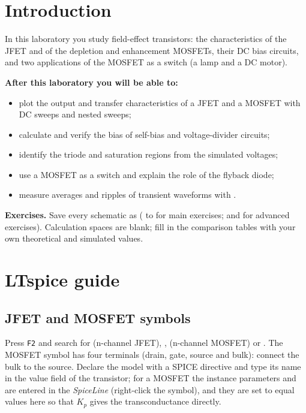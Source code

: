 
\section{Introduction}
In this laboratory you study field-effect transistors: the characteristics of the JFET and of the depletion and enhancement MOSFETs, their DC bias circuits, and two applications of the MOSFET as a switch (a lamp and a DC motor).

\textbf{After this laboratory you will be able to:}
\begin{itemize}
  \item plot the output and transfer characteristics of a JFET and a MOSFET with DC sweeps and nested sweeps;
  \item calculate and verify the bias of self-bias and voltage-divider circuits;
  \item identify the triode and saturation regions from the simulated voltages;
  \item use a MOSFET as a switch and explain the role of the flyback diode;
  \item measure averages and ripples of transient waveforms with .
\end{itemize}

\textbf{Exercises.} Save every schematic as  ( to  for main exercises;  and  for advanced exercises). Calculation spaces are blank; fill in the comparison tables with your own theoretical and simulated values.

\section{LTspice guide}

\subsection{JFET and MOSFET symbols}
Press \texttt{F2} and search for  (n-channel JFET), ,  (n-channel MOSFET) or . The MOSFET symbol has four terminals (drain, gate, source and bulk): connect the bulk to the source. Declare the model with a SPICE directive and type its name in the value field of the transistor; for a MOSFET the instance parameters  and  are entered in the \textit{SpiceLine} (right-click the symbol), and they are set to equal values here so that $K_p$ gives the transconductance directly.

